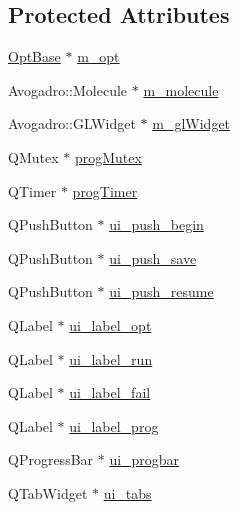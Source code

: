 \subsection*{Protected Attributes}
\begin{DoxyCompactItemize}
\item 
\hyperlink{classGlobalSearch_1_1OptBase}{Opt\-Base} $\ast$ \hyperlink{classGlobalSearch_1_1AbstractDialog_a6a5b08f59d1521ebc4769e9e9903346b}{m\-\_\-opt}
\item 
Avogadro\-::\-Molecule $\ast$ \hyperlink{classGlobalSearch_1_1AbstractDialog_a9cf65fe592eebca0ec72a5597edc7faf}{m\-\_\-molecule}
\item 
Avogadro\-::\-G\-L\-Widget $\ast$ \hyperlink{classGlobalSearch_1_1AbstractDialog_a18c6963416c0b49012fa94fd451c96d9}{m\-\_\-gl\-Widget}
\item 
Q\-Mutex $\ast$ \hyperlink{classGlobalSearch_1_1AbstractDialog_a06e3b73c319208a706aaf629a5f05165}{prog\-Mutex}
\item 
Q\-Timer $\ast$ \hyperlink{classGlobalSearch_1_1AbstractDialog_a1cf317e8206fd80628a9fe6d2ec711fc}{prog\-Timer}
\item 
Q\-Push\-Button $\ast$ \hyperlink{classGlobalSearch_1_1AbstractDialog_a526c9ad4ea52454ba41be74de24cdd6c}{ui\-\_\-push\-\_\-begin}
\item 
Q\-Push\-Button $\ast$ \hyperlink{classGlobalSearch_1_1AbstractDialog_a695ed25af57ce8c854e21d3f2c18e250}{ui\-\_\-push\-\_\-save}
\item 
Q\-Push\-Button $\ast$ \hyperlink{classGlobalSearch_1_1AbstractDialog_a04a1131601c5eab39ef105f385aceca5}{ui\-\_\-push\-\_\-resume}
\item 
Q\-Label $\ast$ \hyperlink{classGlobalSearch_1_1AbstractDialog_af30548b5ed4d5a22a7dc648afae4115b}{ui\-\_\-label\-\_\-opt}
\item 
Q\-Label $\ast$ \hyperlink{classGlobalSearch_1_1AbstractDialog_af65c818f2bf846bcd76aa0e755e13453}{ui\-\_\-label\-\_\-run}
\item 
Q\-Label $\ast$ \hyperlink{classGlobalSearch_1_1AbstractDialog_a28b127a410ed219e13a0e85c889934e7}{ui\-\_\-label\-\_\-fail}
\item 
Q\-Label $\ast$ \hyperlink{classGlobalSearch_1_1AbstractDialog_a21e1395aea6ac29a9c97b7ec2f54eb14}{ui\-\_\-label\-\_\-prog}
\item 
Q\-Progress\-Bar $\ast$ \hyperlink{classGlobalSearch_1_1AbstractDialog_a9b91400d03e9c7f3e94bf6b1f91bb97a}{ui\-\_\-progbar}
\item 
Q\-Tab\-Widget $\ast$ \hyperlink{classGlobalSearch_1_1AbstractDialog_acc93d22a99eb7c11610494ce754b1502}{ui\-\_\-tabs}
\end{DoxyCompactItemize}


